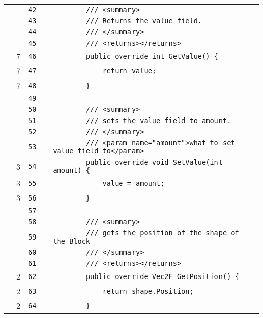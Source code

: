 \documentclass[a4paper,landscape,10pt]{article}
\begin{document}
\begin{longtable}[l]{lrrll}
\cellcolor{gray} &  & \verb~42~ & & \verb~        /// <summary>~\\
\cellcolor{gray} &  & \verb~43~ & & \verb~        /// Returns the value field.~\\
\cellcolor{gray} &  & \verb~44~ & & \verb~        /// </summary>~\\
\cellcolor{gray} &  & \verb~45~ & & \verb~        /// <returns></returns>~\\
\cellcolor{green} & 7 & \verb~46~ & & \verb~        public override int GetValue() {~\\
\cellcolor{green} & 7 & \verb~47~ & & \verb~            return value;~\\
\cellcolor{green} & 7 & \verb~48~ & & \verb~        }~\\
\cellcolor{gray} &  & \verb~49~ & & \verb~~\\
\cellcolor{gray} &  & \verb~50~ & & \verb~        /// <summary>~\\
\cellcolor{gray} &  & \verb~51~ & & \verb~        /// sets the value field to amount.~\\
\cellcolor{gray} &  & \verb~52~ & & \verb~        /// </summary>~\\
\cellcolor{gray} &  & \verb~53~ & & \verb~        /// <param name="amount">what to set value field to</param>~\\
\cellcolor{green} & 3 & \verb~54~ & & \verb~        public override void SetValue(int amount) {~\\
\cellcolor{green} & 3 & \verb~55~ & & \verb~            value = amount;~\\
\cellcolor{green} & 3 & \verb~56~ & & \verb~        }~\\
\cellcolor{gray} &  & \verb~57~ & & \verb~~\\
\cellcolor{gray} &  & \verb~58~ & & \verb~        /// <summary>~\\
\cellcolor{gray} &  & \verb~59~ & & \verb~        /// gets the position of the shape of the Block~\\
\cellcolor{gray} &  & \verb~60~ & & \verb~        /// </summary>~\\
\cellcolor{gray} &  & \verb~61~ & & \verb~        /// <returns></returns>~\\
\cellcolor{green} & 2 & \verb~62~ & & \verb~        public override Vec2F GetPosition() {~\\
\cellcolor{green} & 2 & \verb~63~ & & \verb~            return shape.Position;~\\
\cellcolor{green} & 2 & \verb~64~ & & \verb~        }~\\

\end{longtable}
\end{document}
